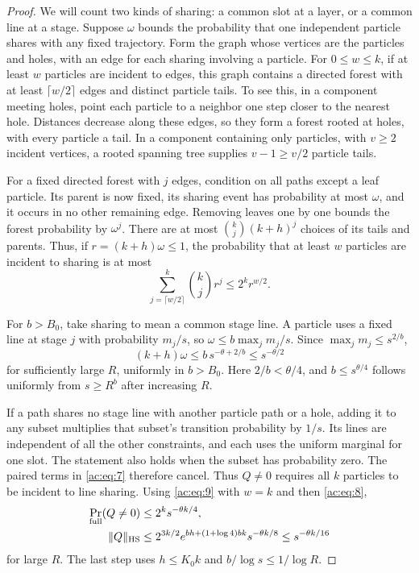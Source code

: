 \begin{proof}
We will count two kinds of sharing: a common slot at a layer, or a common line
at a stage. Suppose \(\omega\) bounds the probability that one independent
particle shares with any fixed trajectory. Form the graph whose vertices are
the particles and holes, with an edge for each sharing involving a particle.
For \(0\le w\le k\), if at least \(w\) particles are incident to edges, this graph contains a
directed forest with at least \(\lceil w/2\rceil\) edges and distinct particle
tails. To see this, in a component meeting holes, point each particle to a
neighbor one step closer to the nearest hole. Distances decrease along these
edges, so they form a forest rooted at holes, with every particle a tail. In
a component containing only particles, with \(v\ge2\) incident vertices, a rooted spanning
tree supplies \(v-1\ge v/2\) particle tails.

For a fixed directed forest with \(j\) edges, condition on all paths except a
leaf particle. Its parent is now fixed, its sharing event has probability at
most \(\omega\), and it occurs in no other remaining edge. Removing leaves
one by one bounds the forest probability by \(\omega^j\). There are at most
\(\binom{k}{j}(k+h)^j\) choices of its tails and parents. Thus, if
\(r=(k+h)\omega\le1\), the probability that at least \(w\) particles are
incident to sharing is at most
\begin{equation}
 \sum_{j=\lceil w/2\rceil}^{k}\binom{k}{j}r^j
 \le 2^k r^{w/2}.
 \label{ac:eq:9}
\end{equation}

For \(b>B_0\), take sharing to mean a common stage line. A particle uses a
fixed line at stage \(j\) with probability \(m_j/s\), so
\(\omega\le b\max_jm_j/s\). Since \(\max_jm_j\le s^{2/b}\),
\[
 (k+h)\omega\le b\,s^{-\theta+2/b}\le s^{-\theta/2}
\]
for sufficiently large \(R\), uniformly in \(b>B_0\). Here \(2/b<\theta/4\),
and \(b\le s^{\theta/4}\) follows uniformly from \(s\ge R^b\) after increasing
\(R\).

If a path shares no stage line with another particle path or a hole, adding
it to any subset multiplies that subset's transition probability by \(1/s\).
Its lines are independent of all the other constraints, and each uses the
uniform marginal for one slot. The statement also holds when the subset has
probability zero. The paired terms in \eqref{ac:eq:7} therefore cancel.
Thus \(Q\ne0\) requires all \(k\) particles to be incident to line sharing.
Using \eqref{ac:eq:9} with \(w=k\) and then \eqref{ac:eq:8},
\[
\begin{aligned}
 \Pr_{\rm full}(Q\ne0)&\le2^k s^{-\theta k/4},\\
 \|Q\|_{\rm HS}
 &\le2^{3k/2}e^{bh+(1+\log4)bk}s^{-\theta k/8}
 \le s^{-\theta k/16}
\end{aligned}
\]
for large \(R\). The last step uses \(h\le K_0k\) and
\(b/\log s\le1/\log R\).


\end{proof}

